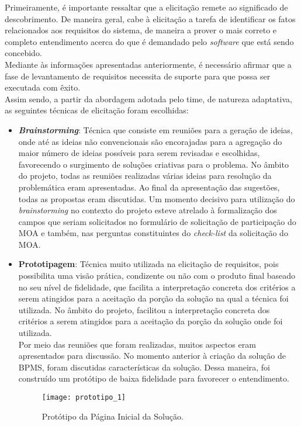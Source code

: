 Primeiramente, é importante ressaltar que a elicitação remete ao significado de descobrimento. De maneira geral, cabe à elicitação a tarefa de identificar os fatos relacionados aos requisitos do sistema, de maneira a prover o mais correto e completo entendimento acerca do que é demandado pelo \emph{software} que está sendo concebido.
\\ \indent Mediante às informações apresentadas anteriormente, é necessário afirmar que a fase de levantamento de requisitos necessita de suporte para que possa ser executada com êxito.
\\ \indent Assim sendo, a partir da abordagem adotada pelo time, de natureza adaptativa, as seguintes técnicas de elicitação foram escolhidas:
\begin{itemize}
	\item{\textbf{\emph{Brainstorming}}: Técnica que consiste em reuniões para a geração de ideias, onde até as ideias não convencionais são encorajadas para a agregação do maior número de ideias possíveis para serem revisadas e escolhidas, favorecendo o surgimento de soluções criativas para o problema. No âmbito do projeto, todas as reuniões realizadas várias ideias para resolução da problemática eram apresentadas. Ao final da apresentação das sugestões, todas as propostas eram discutidas. Um momento decisivo para utilização do \emph{brainstorming} no contexto do projeto esteve atrelado à formalização dos campos que seriam solicitados no formulário de solicitação de participação do MOA e também, nas perguntas constituintes do \emph{check-list} da solicitação do MOA.}
	\item{\textbf{Prototipagem}: Técnica muito utilizada na elicitação de requisitos, pois possibilita uma visão prática, condizente ou não com o produto final baseado no seu nível de fidelidade, que facilita a interpretação concreta dos critérios a serem atingidos para a aceitação da porção da solução na qual a técnica foi utilizada. No âmbito do projeto, facilitou a interpretação concreta dos critérios a serem atingidos para a aceitação da porção da solução onde foi utilizada.
	\\ \indent Por meio das reuniões que foram realizadas, muitos aspectos eram apresentados para discussão. No momento anterior à criação da solução de BPMS, foram discutidas características da solução. Dessa maneira, foi construído um protótipo de baixa fidelidade para favorecer o entendimento.
	\begin{figure}[H]
		\centering
		\texttt{[image: prototipo\_1]}
		\caption[Protótipo da Página Inicial da Solução]{Protótipo da Página Inicial da Solução.}

\end{figure}}
\end{itemize}
